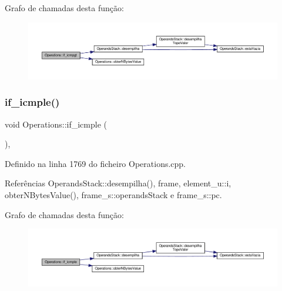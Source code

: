 Grafo de chamadas desta função\+:\nopagebreak
\begin{figure}[H]
\begin{center}
\leavevmode
\includegraphics[width=350pt]{classOperations_a40232532d2522ef0afe261555688a7fd_cgraph}
\end{center}
\end{figure}
\mbox{\label{classOperations_a7a5736e30fcd41a1bccb71c615c4e68d}} 
\subsubsection{\texorpdfstring{if\+\_\+icmple()}{if\_icmple()}}
{\footnotesize\ttfamily void Operations\+::if\+\_\+icmple (\begin{DoxyParamCaption}{ }\end{DoxyParamCaption})\hspace{0.3cm}{\ttfamily [static]}, {\ttfamily [private]}}



Definido na linha 1769 do ficheiro Operations.\+cpp.



Referências Operands\+Stack\+::desempilha(), frame, element\+\_\+u\+::i, obter\+N\+Bytes\+Value(), frame\+\_\+s\+::operands\+Stack e frame\+\_\+s\+::pc.

Grafo de chamadas desta função\+:\nopagebreak
\begin{figure}[H]
\begin{center}
\leavevmode
\includegraphics[width=350pt]{classOperations_a7a5736e30fcd41a1bccb71c615c4e68d_cgraph}
\end{center}
\end{figure}
\mbox{\label{classOperations_a06f624059cfada3f4a726d0482078aaa}} 
